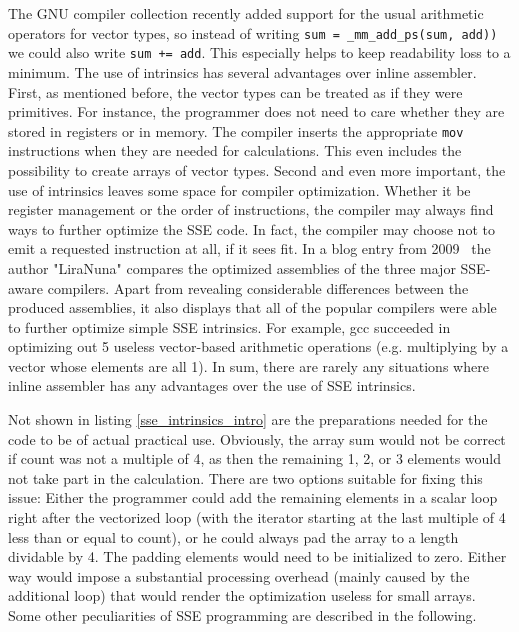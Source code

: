 The GNU compiler collection recently added support for the usual arithmetic operators for vector types, so instead of writing \texttt{sum = \_mm\_add\_ps(sum, add))} we could also write \texttt{sum += add}. This especially helps to keep readability loss to a minimum. The use of intrinsics has several advantages over inline assembler. First, as mentioned before, the vector types can be treated as if they were primitives. For instance, the programmer does not need to care whether they are stored in registers or in memory. The compiler inserts the appropriate \texttt{mov} instructions when they are needed for calculations. This even includes the possibility to create arrays of vector types. Second and even more important, the use of intrinsics leaves some space for compiler optimization. Whether it be register management or the order of instructions, the compiler may always find ways to further optimize the SSE code. In fact, the compiler may choose not to emit a requested instruction at all, if it sees fit. In a blog entry from 2009~\cite{liranuna2009} the author "LiraNuna" compares the optimized assemblies of the three major SSE-aware compilers. Apart from revealing considerable differences between the produced assemblies, it also displays that all of the popular compilers were able to further optimize simple SSE intrinsics. For example, gcc succeeded in optimizing out 5 useless vector-based arithmetic operations (e.g. multiplying by a vector whose elements are all 1). In sum, there are rarely any situations where inline assembler has any advantages over the use of SSE intrinsics.

Not shown in listing \ref{sse_intrinsics_intro} are the preparations needed for the code to be of actual practical use. Obviously, the array sum would not be correct if count was not a multiple of 4, as then the remaining 1, 2, or 3 elements would not take part in the calculation. There are two options suitable for fixing this issue: Either the programmer could add the remaining elements in a scalar loop right after the vectorized loop (with the iterator starting at the last multiple of 4 less than or equal to count), or he could always pad the array to a length dividable by 4. The padding elements would need to be initialized to zero. Either way would impose a substantial processing overhead (mainly caused by the additional loop) that would render the optimization useless for small arrays. Some other peculiarities of SSE programming are described in the following.

